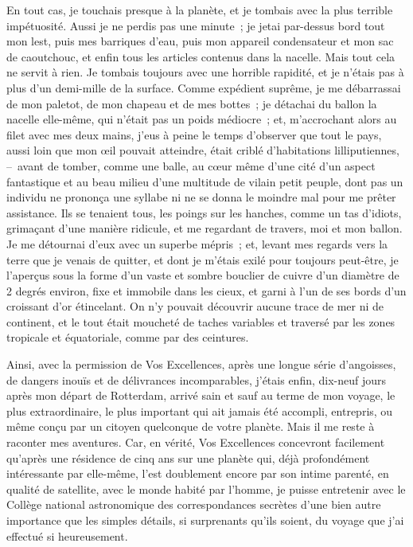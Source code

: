 \documentclass[french,twoside]{book} %
\begin{document}
En tout cas, je touchais presque à la planète, et je tombais avec la plus terrible impétuosité. Aussi je ne perdis pas une minute ; je jetai par-dessus bord tout mon lest, puis mes barriques d’eau, puis mon appareil condensateur et mon sac de caoutchouc, et enfin tous les articles contenus dans la nacelle. Mais tout cela ne servit à rien. Je tombais toujours avec une horrible rapidité, et je n’étais pas à plus d’un demi-mille de la surface. Comme expédient suprême, je me débarrassai de mon paletot, de mon chapeau et de mes bottes ; je détachai du ballon la nacelle elle-même, qui n’était pas un poids médiocre ; et, m’accrochant alors au filet avec mes deux mains, j’eus à peine le temps d’observer que tout le pays, aussi loin que mon œil pouvait atteindre, était criblé d’habitations lilliputiennes, – avant de tomber, comme une balle, au cœur même d’une cité d’un aspect fantastique et au beau milieu d’une multitude de vilain petit peuple, dont pas un individu ne prononça une syllabe ni ne se donna le moindre mal pour me prêter assistance. Ils se tenaient tous, les poings sur les hanches, comme un tas d’idiots, grimaçant d’une manière ridicule, et me regardant de travers, moi et mon ballon. Je me détournai d’eux avec un superbe mépris ; et, levant mes regards vers la terre que je venais de quitter, et dont je m’étais exilé pour toujours peut-être, je l’aperçus sous la forme d’un vaste et sombre bouclier de cuivre d’un diamètre de 2 degrés environ, fixe et immobile dans les cieux, et garni à l’un de ses bords d’un croissant d’or étincelant. On n’y pouvait découvrir aucune trace de mer ni de continent, et le tout était moucheté de taches variables et traversé par les zones tropicale et équatoriale, comme par des ceintures.\par
Ainsi, avec la permission de Vos Excellences, après une longue série d’angoisses, de dangers inouïs et de délivrances incomparables, j’étais enfin, dix-neuf jours après mon départ de Rotterdam, arrivé sain et sauf au terme de mon voyage, le plus extraordinaire, le plus important qui ait jamais été accompli, entrepris, ou même conçu par un citoyen quelconque de votre planète. Mais il me reste à raconter mes aventures. Car, en vérité, Vos Excellences concevront facilement qu’après une résidence de cinq ans sur une planète qui, déjà profondément intéressante par elle-même, l’est doublement encore par son intime parenté, en qualité de satellite, avec le monde habité par l’homme, je puisse entretenir avec le Collège national astronomique des correspondances secrètes d’une bien autre importance que les simples détails, si surprenants qu’ils soient, du voyage que j’ai effectué si heureusement.\par
\end{document}
